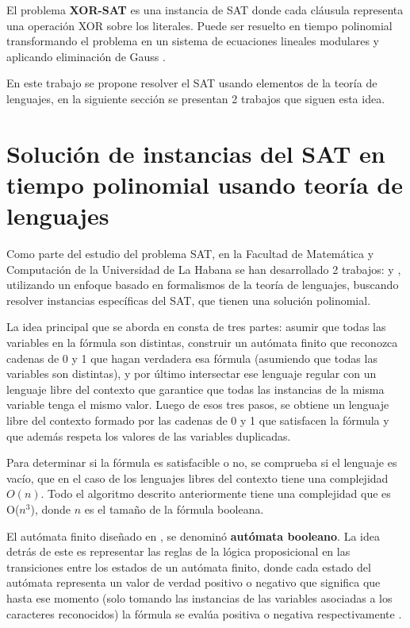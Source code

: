 \documentclass[12pt]{article}
\begin{document}
El problema \textbf{XOR-SAT} es una instancia de SAT donde cada cláusula representa una operación XOR sobre los literales. Puede ser resuelto en tiempo polinomial transformando el problema en un sistema de ecuaciones lineales modulares y aplicando eliminación de Gauss \cite{xorsatbib}.

En este trabajo se propone resolver el SAT usando elementos de la teoría de lenguajes, en la siguiente sección se 
presentan 2 trabajos que siguen esta idea.

\section{Solución de instancias del SAT en tiempo polinomial usando teoría de lenguajes}

Como parte del estudio del problema SAT, en la Facultad de Matemática y Computación de la Universidad de La Habana
se han desarrollado 2 trabajos: \cite{aCFSAT} y \cite{aSRCSAT}, utilizando un enfoque basado en formalismos de la teoría de lenguajes, buscando resolver 
instancias específicas del SAT, que tienen una solución polinomial.

La idea principal que se aborda en \cite{aCFSAT} consta de tres partes: asumir que todas las variables en la fórmula son distintas, construir un autómata finito que reconozca cadenas de 0 y 1 que hagan verdadera esa fórmula (asumiendo que todas las variables son distintas), y por último intersectar ese lenguaje regular con un lenguaje libre del contexto que garantice que todas las instancias de la misma variable tenga el mismo valor. Luego de esos tres pasos, se obtiene un lenguaje libre del contexto formado por las cadenas de 0 y 1 que satisfacen la fórmula y que además respeta los valores de las variables duplicadas.

Para determinar si la fórmula es satisfacible o no, se comprueba si el lenguaje es vacío, que en el caso de los lenguajes libres del contexto tiene una complejidad $O(n)$. Todo el algoritmo descrito anteriormente tiene una complejidad que es O($n^3$), donde $n$ es el tamaño de la fórmula booleana.

El autómata finito diseñado en \cite{aCFSAT}, se denominó \textbf{autómata booleano}. La idea detrás de este es representar las reglas de la lógica proposicional en las transiciones entre los estados de un autómata finito, donde cada estado del autómata representa un valor de verdad positivo o negativo que significa que hasta ese momento (solo tomando las instancias de las variables asociadas a los caracteres reconocidos) la fórmula se evalúa positiva o negativa respectivamente \cite{aCFSAT}.
\end{document}
